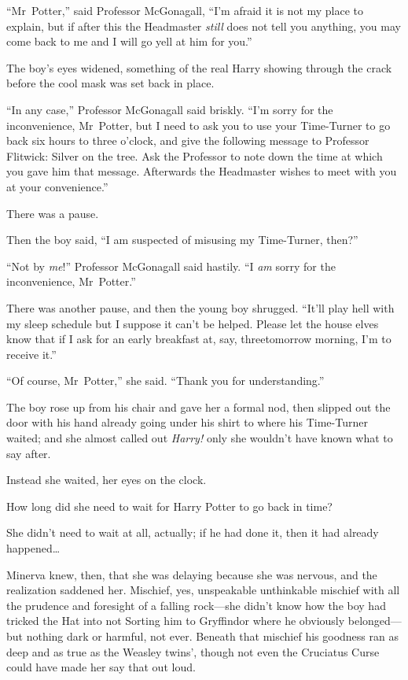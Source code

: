 “Mr~Potter,” said Professor McGonagall, “I’m afraid it is not my place to explain, but if after this the Headmaster \emph{still} does not tell you anything, you may come back to me and I will go yell at him for you.”

The boy’s eyes widened, something of the real Harry showing through the crack before the cool mask was set back in place.

“In any case,” Professor McGonagall said briskly. “I’m sorry for the inconvenience, Mr~Potter, but I need to ask you to use your Time-Turner to go back six hours to three o’clock, and give the following message to Professor Flitwick: Silver on the tree. Ask the Professor to note down the time at which you gave him that message. Afterwards the Headmaster wishes to meet with you at your convenience.”

There was a pause.

Then the boy said, “I am suspected of misusing my Time-Turner, then?”

“Not by \emph{me}!” Professor McGonagall said hastily. “I \emph{am} sorry for the inconvenience, Mr~Potter.”

There was another pause, and then the young boy shrugged. “It’ll play hell with my sleep schedule but I suppose it can’t be helped. Please let the house elves know that if I ask for an early breakfast at, say, three\am tomorrow morning, I’m to receive it.”

“Of course, Mr~Potter,” she said. “Thank you for understanding.”

The boy rose up from his chair and gave her a formal nod, then slipped out the door with his hand already going under his shirt to where his Time-Turner waited; and she almost called out \emph{Harry!} only she wouldn’t have known what to say after.

Instead she waited, her eyes on the clock.

How long did she need to wait for Harry Potter to go back in time?

She didn’t need to wait at all, actually; if he had done it, then it had already happened…

Minerva knew, then, that she was delaying because she was nervous, and the realization saddened her. Mischief, yes, unspeakable unthinkable mischief with all the prudence and foresight of a falling rock—she didn’t know how the boy had tricked the Hat into not Sorting him to Gryffindor where he obviously belonged—but nothing dark or harmful, not ever. Beneath that mischief his goodness ran as deep and as true as the Weasley twins’, though not even the Cruciatus Curse could have made her say that out loud.

